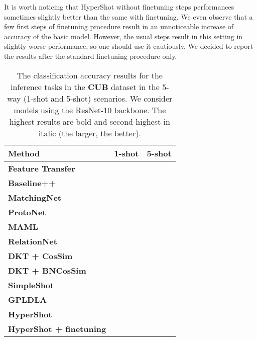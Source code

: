 \documentclass[nohyperref]{article}
\def\our{HyperShot}
\theoremstyle{plain}
\theoremstyle{definition}
\theoremstyle{remark}
\begin{document}
It is worth noticing that \our{} without finetuning steps performances sometimes slightly better than the same with finetuning. We even observe that a few first steps of finetuning procedure result in an unnoticeable increase of accuracy of the basic model. However, the usual  steps result in this setting in slightly worse performance, so one should use it cautiously. We decided to report the results after the standard finetuning procedure only.


\begin{table*}[h!]
\centering
\caption{ The classification accuracy results for the inference tasks in the \textbf{CUB} dataset in the 5-way (1-shot and 5-shot) scenarios. We consider models using the ResNet-10 backbone. The highest results are bold and second-highest in italic (the larger, the better).}
\label{tab:cubresnet}
\begin{tabular}{lcc}
\toprule
\textbf{Method}    & \textbf{1-shot} & \textbf{5-shot} \\
\midrule
\textbf{Feature Transfer}    &   &  \\
\textbf{Baseline++}  \cite{chen2019closer}  &  &   \\
\textbf{MatchingNet} \cite{vinyals2016matching}   &  &   \\
\textbf{ProtoNet} \cite{snell2017prototypical}   &  &  \\
\textbf{MAML} \cite{finn2017model}   &  &  \\
\textbf{RelationNet}  \cite{sung2018learning}  &   &  \\
\textbf{DKT + CosSim} \cite{patacchiola2020bayesian}   &  &  \\
\textbf{DKT + BNCosSim} \cite{patacchiola2020bayesian}   &  &  \\
\textbf{SimpleShot} \cite{wang2019simpleshot} &  &  \\
\textbf{GPLDLA} \cite{kim2021gaussian} &  &  \\
\midrule
\textbf{\our{}}   &  &  \\
\textbf{\our{} + finetuning}   &  &  \\
\bottomrule
\end{tabular}
\end{table*}
\end{document}
